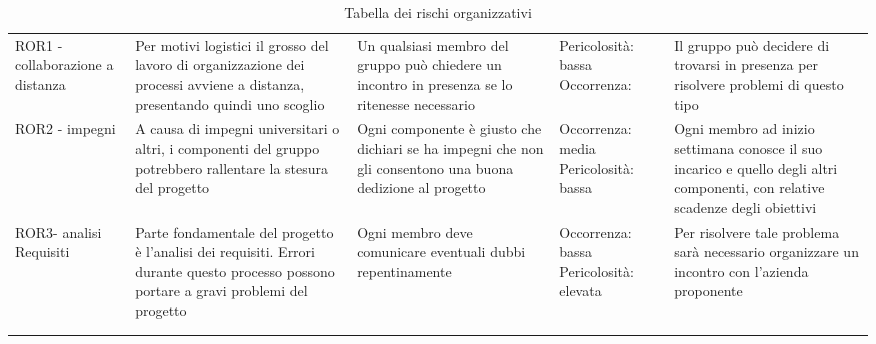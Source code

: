 {\begin{longtable}{C{.13\freewidth} C{.24\freewidth} C{.22\freewidth} C{.18\freewidth} C{.282379\freewidth}}
      ROR1 - collaborazione a distanza & Per motivi logistici il grosso del lavoro di organizzazione dei processi avviene a distanza, presentando quindi uno scoglio & Un qualsiasi membro del gruppo può chiedere un incontro in presenza se lo ritenesse necessario
      & Pericolosità: bassa Occorrenza:  & Il gruppo può decidere di trovarsi in presenza per risolvere problemi di questo tipo \\
      ROR2 - impegni & A causa di impegni universitari o altri, i componenti del gruppo potrebbero rallentare la stesura del progetto & Ogni componente è giusto che dichiari se ha  impegni che non gli consentono una buona dedizione al progetto
      & Occorrenza: media Pericolosità: bassa & Ogni membro ad inizio settimana conosce il suo incarico e quello degli altri componenti, con relative scadenze degli obiettivi \\
      ROR3- analisi Requisiti & Parte fondamentale del progetto è l’analisi dei requisiti. Errori durante questo processo possono portare a gravi problemi del progetto & Ogni membro deve comunicare eventuali dubbi repentinamente 
      & Occorrenza: bassa Pericolosità: elevata & Per risolvere tale problema sarà necessario organizzare un incontro con l’azienda proponente \\
      \bottomrule
      \\
      \caption{Tabella dei rischi organizzativi}
      \end{longtable}
   }

   \newpage

